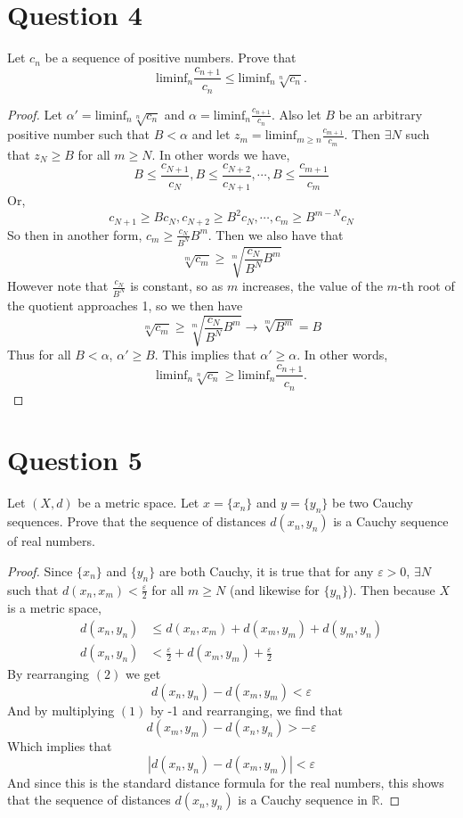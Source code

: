 \documentclass[12pt, letterpaper]{article}
\begin{document}
\section*{Question 4}
Let $c_n$ be a sequence of positive numbers. Prove that
\[
\mathrm{liminf}_n \frac{c_{n+1}}{c_n} \leq \mathrm{liminf}_n \sqrt[n]{c_n}.
\]
\begin{proof}
  Let $\alpha'= \mathrm{liminf}_n \sqrt[n]{c_n}$ and $\alpha = \mathrm{liminf}_n \frac{c_{n+1}}{c_n}$. Also let $B$ be an arbitrary positive number such that $B < \alpha$ and let $z_m = \mathrm{liminf}_{m \geq n} \frac{c_{m+1}}{c_m}$. Then $\exists N$ such that $z_N \geq B$ for all $m \geq N$. In other words we have,
  $$ B \leq \frac{c_{N + 1}}{c_N}, B \leq \frac{c_{N + 2}}{c_{N + 1}}, \cdots, B \leq \frac{c_{m + 1}}{c_m}$$
  Or,
  $$ c_{N+1} \geq Bc_N, c_{N+2} \geq B^2c_N, \cdots, c_m \geq B^{m - N}c_N $$
  So then in another form, $c_m \geq \frac{c_N}{B^N}B^m$. Then we also have that
  $$ \sqrt[m]{c_m} \geq \sqrt[m]{\frac{c_N}{B^N}B^m} $$
  However note that $\frac{c_N}{B^N}$ is constant, so as $m$ increases, the value of the $m$-th root of the quotient approaches 1, so we then have
  $$ \sqrt[m]{c_m} \geq \sqrt[m]{\frac{c_N}{B^N}B^m} \to \sqrt[m]{B^m} = B$$
  Thus for all $B < \alpha$, $\alpha' \geq B$. This implies that $\alpha' \geq \alpha$. In other words,
  \[
  \mathrm{liminf}_n \sqrt[n]{c_n} \geq \mathrm{liminf}_n \frac{c_{n+1}}{c_n}.
  \]
\end{proof}
\pagebreak

\section*{Question 5}
Let $(X,d)$ be a metric space.  Let $x=\{x_n\}$ and $y=\{y_n\}$ be two Cauchy sequences.
Prove that the sequence of distances $d(x_n,y_n)$ is a Cauchy sequence of real numbers.

\begin{proof}
  Since $\{x_n\}$ and $\{y_n\}$ are both Cauchy, it is true that for any $\varepsilon > 0$, $\exists N$ such that $d(x_n, x_m) < \frac{\varepsilon}{2}$ for all $m \geq N$ (and likewise for $\{y_n\}$).
  Then because $X$ is a metric space,
  \begin{align}
    d(x_n, y_n) &\leq d(x_n, x_m) + d(x_m, y_m) + d(y_m, y_n)\\
    d(x_n, y_n) &< \frac{\varepsilon}{2} + d(x_m, y_m) + \frac{\varepsilon}{2}
  \end{align}
  By rearranging $(2)$ we get
  $$ d(x_n, y_n) -  d(x_m, y_m) < \varepsilon $$
  And by multiplying $(1)$ by -1 and rearranging, we find that
  $$ d(x_m, y_m) - d(x_n, y_n) > -\varepsilon $$
  Which implies that
  $$ |d(x_n, y_n) -  d(x_m, y_m)| < \varepsilon $$
  And since this is the standard distance formula for the real numbers, this shows that the sequence of distances $d(x_n,y_n)$ is a Cauchy sequence in $\mathbb{R}$.
\end{proof}
\pagebreak
\end{document}

